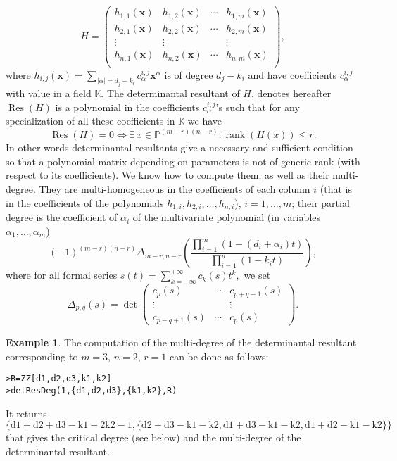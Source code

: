 \documentclass[10pt]{amsart}
\theoremstyle{plain}
\theoremstyle{definition}
\newtheorem{exmp}[thm]{Example}
\def\PP{{\mathbb{P}}}
\def\KK{{\mathbb{K}}}
\def\x{\mathbf{x}}
\DeclareMathOperator\Res{Res}
\DeclareMathOperator\rank{rank}
\begin{document}
$$H=\left( \begin{array}{cccc}
    h_{1,1}(\x) & h_{1,2}(\x) & \cdots & h_{1,m}(\x) \\
    h_{2,1}(\x) & h_{2,2}(\x) & \cdots & h_{2,m}(\x) \\
    \vdots & \vdots & & \vdots \\
    h_{n,1}(\x) & h_{n,2}(\x) & \cdots & h_{n,m}(\x) \\
  \end{array} \right),$$
where $h_{i,j}(\x)=\sum_{|\alpha|=d_j-k_i}c_{\alpha}^{i,j}\x^\alpha$ is of degree $d_j-k_i$ and have coefficients $c_{\alpha}^{i,j}$ with value in a field $\KK$. The determinantal resultant of $H$, denotes hereafter $\Res(H)$ is a polynomial in the coefficients $c_{\alpha}^{i,j}$'s such that for any specialization of all these coefficients in $\KK$ we have
$$\Res(H)=0 \Leftrightarrow \exists \, x \in \PP^{(m-r)(n-r)} : \rank(H(x))\leq r.$$
In other words determinantal resultants give a necessary and sufficient condition so that a polynomial matrix depending on parameters is not of generic rank (with respect to its coefficients). We know how to compute them, as well as their multi-degree. They are multi-homogeneous in the coefficients of each column $i$ (that is in the
coefficients of the polynomials $h_{1,i},h_{2,i},\ldots,h_{n,i}$), $i=1,\ldots,m$; their partial degree 
is the
coefficient of $\alpha_i$ of the multivariate polynomial (in variables
$\alpha_1,\ldots,\alpha_m$)
\begin{equation*}\label{degr}
(-1)^{(m-r)(n-r)}\Delta_{m-r,n-r}\left(\frac{\prod_{i=1}^{m}(1-(d_i+\alpha_i)t)}{\prod_{i=1}^{n}(1-k_it)}\right),
\end{equation*}
where for all formal series $s(t)=\sum_{k=-\infty}^{+\infty}c_k(s)t^k,$ 
we set 
$$\Delta_{p,q}(s)=\det\left(
         \begin{array}{ccc}
          c_p(s) & \cdots & c_{p+q-1}(s) \\
          \vdots & & \vdots \\
          c_{p-q+1}(s) & \cdots & c_p(s)
         \end{array}
  \right).$$

\begin{exmp} The computation of the multi-degree of the determinantal resultant corresponding to $m=3$, $n=2$, $r=1$ can be done as follows:
\begin{verbatim}
>R=ZZ[d1,d2,d3,k1,k2]
>detResDeg(1,{d1,d2,d3},{k1,k2},R)
\end{verbatim}
It returns $\{{\text{d1}}+{\text{d2}}+{\text{d3}}-\text{k1}-2 \text{k2}-1,\{{\text{d2}}+{\text{d3}}-\text{k1}-\text{k2},{\text{d1}}+{\text{d3}}-\text{k1}-\text{k2},{\text{d1}}+{\text{d2}}-\text{k1}-\text{k2}\}\}$ that gives the critical degree (see below) and the multi-degree of the determinantal resultant. 
\end{exmp}
\end{document}
